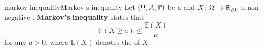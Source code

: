 \begin{topic}{markov-inequality}{Markov's inequality}
    Let $(\Omega, \mathcal{A}, \mathbb{P})$ be a  and $X \colon \Omega \to \mathbb{R}_{\ge 0}$ a non-negative . \textbf{Markov's inequality} states that
    \[ \mathbb{P}(X \ge a) \le \frac{\mathbb{E}(X)}{a} \]
    for any $a > 0$, where $\mathbb{E}(X)$ denotes the  of $X$.
\end{topic}
